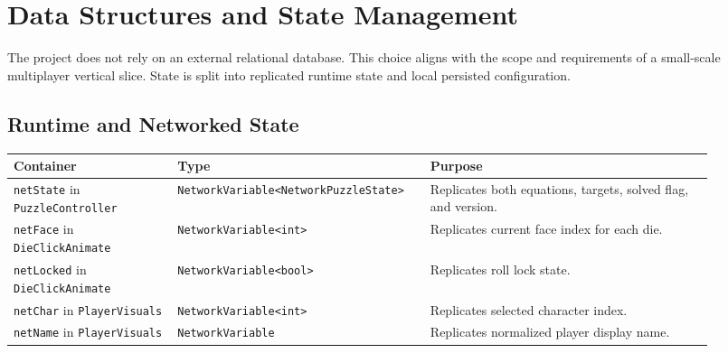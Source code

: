\section{Data Structures and State Management}
The project does not rely on an external relational database. This choice aligns with the scope and requirements of a small-scale multiplayer vertical slice. State is split into replicated runtime state and local persisted configuration.

\subsection*{Runtime and Networked State}
\begin{table}[H]
\centering
\caption{Primary Runtime State Containers}
\label{tab:runtime-state-containers}
\begin{longtable}{|>{\centering\arraybackslash}m{0.22\linewidth}|>{\centering\arraybackslash}m{0.3\linewidth}|>{\centering\arraybackslash}m{0.38\linewidth}|}
\hline
\hline
\textbf{Container} & \textbf{Type} & \textbf{Purpose} \\
\hline
\texttt{netState} in \texttt{PuzzleController} & \texttt{NetworkVariable\allowbreak<NetworkPuzzleState>} & Replicates both equations, targets, solved flag, and version. \\
\hline
\texttt{netFace} in \texttt{DieClickAnimate} & \texttt{NetworkVariable<int>} & Replicates current face index for each die. \\
\hline
\texttt{netLocked} in \texttt{DieClickAnimate} & \texttt{NetworkVariable<bool>} & Replicates roll lock state. \\
\hline
\texttt{netChar} in \texttt{PlayerVisuals} & \texttt{NetworkVariable<int>} & Replicates selected character index. \\
\hline
\texttt{netName} in \texttt{PlayerVisuals} & \texttt{NetworkVariable} & Replicates normalized player display name. \\
\hline
\end{longtable}
\addtocounter{table}{-1}
\end{table}

\newpage

